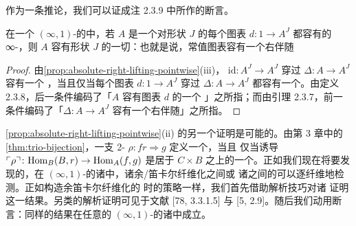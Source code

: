 作为一条推论，我们可以证成注 2.3.9 中所作的断言。

\begin{corollary}\label{cor:pointwise-limits-adjoint}
在一个 $(\infty,1)$-\trCategory{}的\trInfinityCosmos{}中，若 $A$ 是一个对形状
$J$ 的每个图表 $d\colon 1\to A^{J}$ 都容有\trLimit{}的∞-\trCategory，则 $A$
容有形状 $J$ 的一切\trLimit：也就是说，常值图表\trFunctor{}容有一个右伴随
\begin{center}
\end{center}
\end{corollary}

\begin{proof}
由\cref{prop:absolute-right-lifting-pointwise}(iii)，\trFunctor{}
$\mathrm{id}\colon A^{J}\to A^{J}$ 穿过 $\Delta\colon A\to A^{J}$ 容有一个%
\trAbsoluteRightLifting，当且仅当每个图表 $d\colon 1\to A^{J}$ 穿过 $\Delta\colon A\to A^{J}$
都容有一个\trAbsoluteRightLifting。由定义 2.3.8，后一条件编码了「$A$ 容有图表 $d$ 的一个%
\trLimit」之所指；而由引理 2.3.7，前一条件编码了「$\Delta\colon A\to A^{J}$
容有一个右伴随」之所指。
\end{proof}

\cref{prop:absolute-right-lifting-pointwise}(ii) 的另一个证明是可能的。由第 3 章中的%
\cref{thm:trio-bijection}，一支 2-\trCell{} $\rho\colon fr\Rightarrow g$ 定义一个\trAbsoluteRightLifting，当且
仅当诱导\trFunctor{}
$\ulcorner\rho\urcorner\colon\mathrm{Hom}_{B}(B,r)\to\mathrm{Hom}_{A}(f,g)$ 是居于
$C\times B$ 之上的一个\trFiberedEquivalence。正如我们现在将要发现的，在
$(\infty,1)$-\trCategory{}的诸\trInfinityCosmos{}中，诸余/笛卡尔纤维化之间或
诸\trModule{}之间的\trEquivalence{}可以逐纤维地检测。正如构造余笛卡尔纤维化的%
\trRightAdjoint\trRightInverse{}时的策略一样，我们首先借助解析技巧对诸%
\trQuasiCategory{}证明这一结果。另类的解析证明可见于文献 [78, 3.3.1.5] 与
[5, 2.9]。随后我们动用\trModelIndependence{}断言：同样的结果在任意的
$(\infty,1)$-\trCategory{}的诸\trInfinityCosmos{}中成立。


